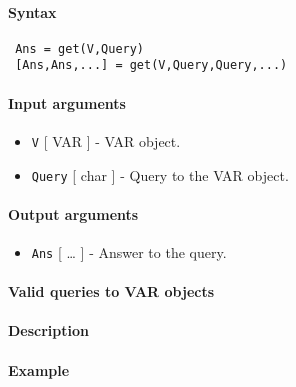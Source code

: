 


	\paragraph{Syntax}
 
 \begin{verbatim}
 Ans = get(V,Query)
 [Ans,Ans,...] = get(V,Query,Query,...)
 \end{verbatim}
 
 \paragraph{Input arguments}
 
 \begin{itemize}
 \item
   \texttt{V} {[} VAR {]} - VAR object.
 \item
   \texttt{Query} {[} char {]} - Query to the VAR object.
 \end{itemize}
 
 \paragraph{Output arguments}
 
 \begin{itemize}
 \item
   \texttt{Ans} {[} \ldots{} {]} - Answer to the query.
 \end{itemize}
 
 \paragraph{Valid queries to VAR objects}
 
 \paragraph{Description}
 
 \paragraph{Example}


